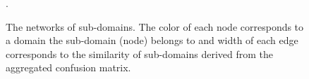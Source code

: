 \begin{figure}
\caption{The networks of sub-domains. The color of each node corresponds to a domain the sub-domain (node) belongs to and width of each edge corresponds to the similarity of sub-domains derived from the aggregated confusion matrix.} \label{meta_network}.
\end{figure}


